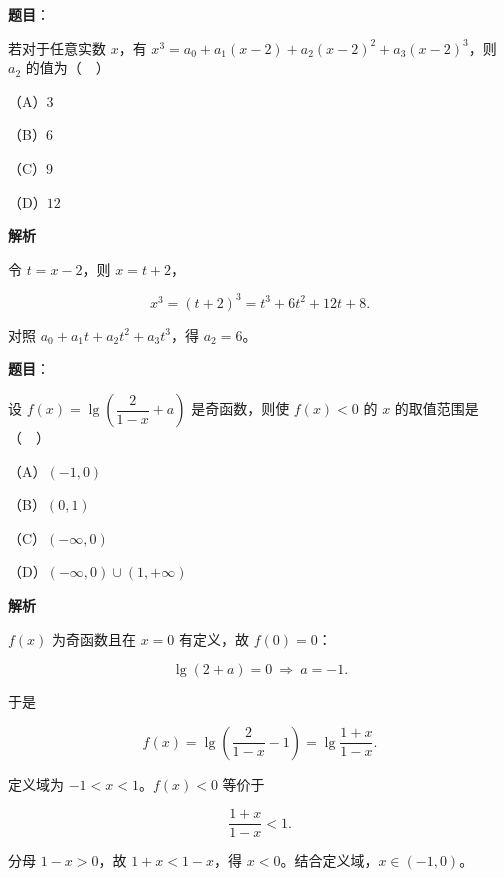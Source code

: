\begin{answer}

\textbf{题目}：

若对于任意实数 $x$，有 $x^3=a_0+a_1(x-2)+a_2(x-2)^2+a_3(x-2)^3$，则 $a_2$ 的值为（　）

（A）$3$

（B）$6$

（C）$9$

（D）$12$

\textbf{解析}

令 $t=x-2$，则 $x=t+2$，

\nopagebreak[4]
\[x^3=(t+2)^3=t^3+6t^2+12t+8.\]

对照 $a_0+a_1t+a_2t^2+a_3t^3$，得 $a_2=6$。


\end{answer}
\begin{answer}

\textbf{题目}：

设 $f(x)=\lg\left(\dfrac{2}{1-x}+a\right)$ 是奇函数，则使 $f(x)<0$ 的 $x$ 的取值范围是（　）

（A）$(-1,0)$

（B）$(0,1)$

（C）$(-\infty,0)$

（D）$(-\infty,0)\cup(1,+\infty)$

\textbf{解析}

$f(x)$ 为奇函数且在 $x=0$ 有定义，故 $f(0)=0$：

\nopagebreak[4]
\[\lg(2+a)=0\ \Rightarrow\ a=-1.\]

于是

\nopagebreak[4]
\[f(x)=\lg\left(\frac2{1-x}-1\right)=\lg\frac{1+x}{1-x}.\]

定义域为 $-1<x<1$。$f(x)<0$ 等价于

\nopagebreak[4]
\[\frac{1+x}{1-x}<1.\]

分母 $1-x>0$，故 $1+x<1-x$，得 $x<0$。结合定义域，$x\in(-1,0)$。


\end{answer}

